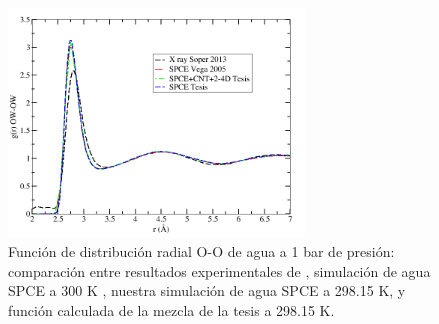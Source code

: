


\begin{figure}[!hbt]
    \centering
    \includegraphics[width=0.7\textwidth,keepaspectratio=true]{resultados/gOOcartel.png}
    \caption{Función de distribución radial O-O de agua a 1 bar de presión: comparación entre resultados experimentales de \cite{Soper2013}, simulación de agua SPCE a 300 K \cite{vega2005}, nuestra simulación de agua SPCE a 298.15 K, y función calculada de la mezcla de la tesis a 298.15 K.}
    \label{fig:OO}
\end{figure}

